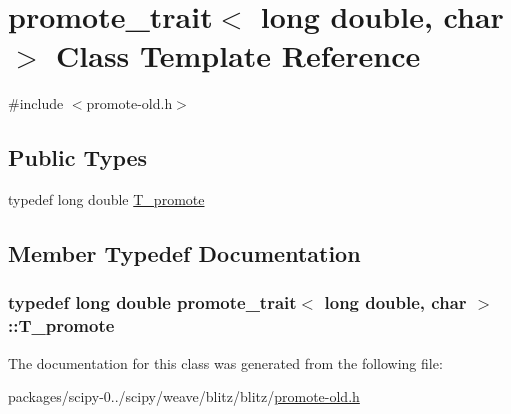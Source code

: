 \hypertarget{classpromote__trait_3_01long_01double_00_01char_01_4}{}\section{promote\+\_\+trait$<$ long double, char $>$ Class Template Reference}
\label{classpromote__trait_3_01long_01double_00_01char_01_4}


{\ttfamily \#include $<$promote-\/old.\+h$>$}

\subsection*{Public Types}
\begin{DoxyCompactItemize}
\item 
typedef long double \hyperlink{classpromote__trait_3_01long_01double_00_01char_01_4_aca260eabdbe669366f764a3aa10cd819}{T\+\_\+promote}
\end{DoxyCompactItemize}


\subsection{Member Typedef Documentation}
\hypertarget{classpromote__trait_3_01long_01double_00_01char_01_4_aca260eabdbe669366f764a3aa10cd819}{}
\subsubsection[{T\+\_\+promote}]{\setlength{\rightskip}{0pt plus 5cm}typedef long double {\bf promote\+\_\+trait}$<$ long double, char $>$\+::{\bf T\+\_\+promote}}\label{classpromote__trait_3_01long_01double_00_01char_01_4_aca260eabdbe669366f764a3aa10cd819}


The documentation for this class was generated from the following file\+:\begin{DoxyCompactItemize}
\item 
packages/scipy-\/0../scipy/weave/blitz/blitz/\hyperlink{promote-old_8h}{promote-\/old.\+h}\end{DoxyCompactItemize}
